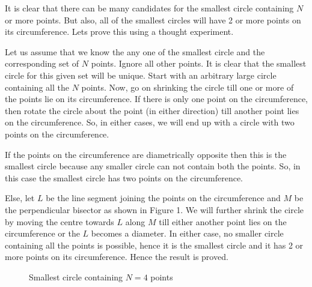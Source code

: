 \documentclass{article}
\begin{document}
        It is clear that there can be many candidates for the smallest circle containing $N$ or more points. But also, all of the smallest circles will have 2 or more points on its circumference. Lets prove this using a thought experiment.

        Let us assume that we know the any one of the smallest circle and the corresponding set of $N$ points. Ignore all other points. It is clear that the smallest circle for this given set will be unique. Start with an arbitrary large circle containing all the $N$ points. Now, go on shrinking the circle till one or more of the points lie on its circumference. If there is only one point on the circumference, then rotate the circle about the point (in either direction) till another point lies on the circumference. So, in either cases, we will end up with a circle with two points on the circumference.

        If the points on the circumference are diametrically opposite then this is the smallest circle because any smaller circle can not contain both the points. So, in this case the smallest circle has two points on the circumference.

        Else, let $L$ be the line segment joining the points on the circumference and $M$ be the perpendicular bisector as shown in Figure 1. We will further shrink the circle by moving the centre towards $L$ along $M$ till either another point lies on the circumference or the $L$ becomes a diameter. In either case, no smaller circle containing all the points is possible, hence it is the smallest circle and it has 2 or more points on its circumference. Hence the result is proved. \\

        \begin{figure}
            \centering
            \caption {Smallest circle containing $N=4$ points}
        \end{figure}
\end{document}
